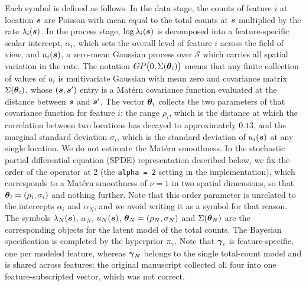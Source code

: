 \documentclass[10pt,letterpaper]{article}
\begin{document}
Each symbol is defined as follows. In the data stage, the counts of feature $i$ at location $\mbox{\boldmath $s$}$ are Poisson with mean equal to the total counts at $\mbox{\boldmath $s$}$ multiplied by the rate $\lambda_i(\mbox{\boldmath $s$})$. In the process stage, $\log\lambda_i(\mbox{\boldmath $s$})$ is decomposed into a feature-specific scalar intercept, $\alpha_i$, which sets the overall level of feature $i$ across the field of view, and $u_i(\mbox{\boldmath $s$})$, a zero-mean Gaussian process over $\mathcal{S}$ which carries all spatial variation in the rate. The notation $GP\big(0,\Sigma(\mbox{\boldmath $\theta$}_i)\big)$ means that any finite collection of values of $u_i$ is multivariate Gaussian with mean zero and covariance matrix $\Sigma(\mbox{\boldmath $\theta$}_i)$, whose $(\mbox{\boldmath $s$},\mbox{\boldmath $s$}')$ entry is a Mat\'ern covariance function evaluated at the distance between $\mbox{\boldmath $s$}$ and $\mbox{\boldmath $s$}'$. The vector $\mbox{\boldmath $\theta$}_i$ collects the two parameters of that covariance function for feature $i$: the range $\rho_i$, which is the distance at which the correlation between two locations has decayed to approximately $0.13$, and the marginal standard deviation $\sigma_i$, which is the standard deviation of $u_i(\mbox{\boldmath $s$})$ at any single location. We do not estimate the Mat\'ern smoothness. In the stochastic partial differential equation (SPDE) representation described below, we fix the order of the operator at 2 (the \texttt{alpha = 2} setting in the implementation), which corresponds to a Mat\'ern smoothness of $\nu=1$ in two spatial dimensions, so that $\mbox{\boldmath $\theta$}_i = (\rho_i, \sigma_i)$ and nothing further. Note that this order parameter is unrelated to the intercepts $\alpha_i$ and $\alpha_N$, and we avoid writing it as a symbol for that reason. The symbols $\lambda_N(\mbox{\boldmath $s$})$, $\alpha_N$, $u_N(\mbox{\boldmath $s$})$, $\mbox{\boldmath $\theta$}_N = (\rho_N,\sigma_N)$ and $\Sigma(\mbox{\boldmath $\theta$}_N)$ are the corresponding objects for the latent model of the total counts. The Bayesian specification is completed by the hyperprior $\pi_\gamma$. Note that $\mbox{\boldmath $\gamma$}_i$ is feature-specific, one per modeled feature, whereas $\mbox{\boldmath $\gamma$}_N$ belongs to the single total-count model and is shared across features; the original manuscript collected all four into one feature-subscripted vector, which was not correct.
\end{document}

